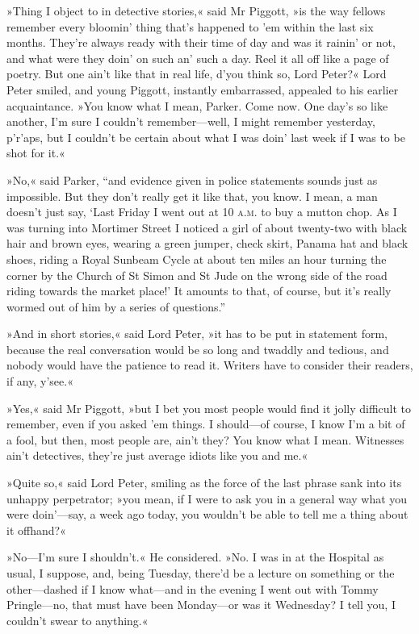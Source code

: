 »Thing I object to in detective stories,« said Mr Piggott, »is the way fellows remember every bloomin' thing that's happened to 'em within the last six months. They're always ready with their time of day and was it rainin' or not, and what were they doin' on such an' such a day. Reel it all off like a page of poetry. But one ain't like that in real life, d'you think so, Lord Peter?« Lord Peter smiled, and young Piggott, instantly embarrassed, appealed to his earlier acquaintance. »You know what I mean, Parker. Come now. One day's so like another, I'm sure I couldn't remember\allowbreak---\allowbreak well, I might remember yesterday, p'r'aps, but I couldn't be certain about what I was doin' last week if I was to be shot for it.«

»No,« said Parker, \enquote{and evidence given in police statements sounds just as impossible. But they don't really get it like that, you know. I mean, a man doesn't just say, \enquote{Last Friday I went out at 10 \textsc{a.m.} to buy a mutton chop. As I was turning into Mortimer Street I noticed a girl of about twenty-two with black hair and brown eyes, wearing a green jumper, check skirt, Panama hat and black shoes, riding a Royal Sunbeam Cycle at about ten miles an hour turning the corner by the Church of St Simon and St Jude on the wrong side of the road riding towards the market place!} It amounts to that, of course, but it's really wormed out of him by a series of questions.}

»And in short stories,« said Lord Peter, »it has to be put in statement form, because the real conversation would be so long and twaddly and tedious, and nobody would have the patience to read it. Writers have to consider their readers, if any, y'see.«

»Yes,« said Mr Piggott, »but I bet you most people would find it jolly difficult to remember, even if you asked 'em things. I should\allowbreak---\allowbreak of course, I know I'm a bit of a fool, but then, most people are, ain't they? You know what I mean. Witnesses ain't detectives, they're just average idiots like you and me.«

»Quite so,« said Lord Peter, smiling as the force of the last phrase sank into its unhappy perpetrator; »you mean, if I were to ask you in a general way what you were doin'---say, a week ago today, you wouldn't be able to tell me a thing about it offhand?«

»No\allowbreak---\allowbreak I'm sure I shouldn't.« He considered. »No. I was in at the Hospital as usual, I suppose, and, being Tuesday, there'd be a lecture on something or the other\allowbreak---\allowbreak dashed if I know what\allowbreak---\allowbreak and in the evening I went out with Tommy Pringle\allowbreak---\allowbreak no, that must have been Monday\allowbreak---\allowbreak or was it Wednesday? I tell you, I couldn't swear to anything.«

